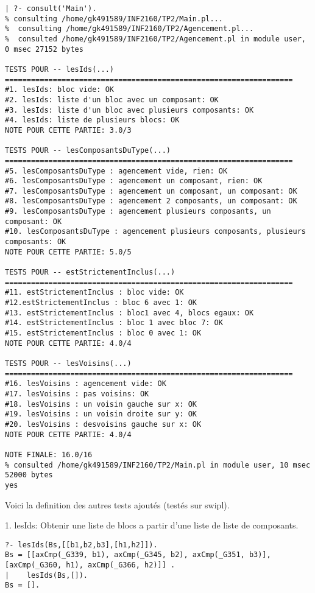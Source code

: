 \documentclass[letterpaper,11pt]{letter}
\begin{document}
\begin{verbatim}
| ?- consult('Main').
% consulting /home/gk491589/INF2160/TP2/Main.pl...
%  consulting /home/gk491589/INF2160/TP2/Agencement.pl...
%  consulted /home/gk491589/INF2160/TP2/Agencement.pl in module user, 0 msec 27152 bytes

TESTS POUR -- lesIds(...)
==================================================================
#1. lesIds: bloc vide: OK
#2. lesIds: liste d'un bloc avec un composant: OK
#3. lesIds: liste d'un bloc avec plusieurs composants: OK
#4. lesIds: liste de plusieurs blocs: OK
NOTE POUR CETTE PARTIE: 3.0/3

TESTS POUR -- lesComposantsDuType(...)
==================================================================
#5. lesComposantsDuType : agencement vide, rien: OK
#6. lesComposantsDuType : agencement un composant, rien: OK
#7. lesComposantsDuType : agencement un composant, un composant: OK
#8. lesComposantsDuType : agencement 2 composants, un composant: OK
#9. lesComposantsDuType : agencement plusieurs composants, un composant: OK
#10. lesComposantsDuType : agencement plusieurs composants, plusieurs composants: OK
NOTE POUR CETTE PARTIE: 5.0/5

TESTS POUR -- estStrictementInclus(...)
==================================================================
#11. estStrictementInclus : bloc vide: OK
#12.estStrictementInclus : bloc 6 avec 1: OK
#13. estStrictementInclus : bloc1 avec 4, blocs egaux: OK
#14. estStrictementInclus : bloc 1 avec bloc 7: OK
#15. estStrictementInclus : bloc 0 avec 1: OK
NOTE POUR CETTE PARTIE: 4.0/4

TESTS POUR -- lesVoisins(...)
==================================================================
#16. lesVoisins : agencement vide: OK
#17. lesVoisins : pas voisins: OK
#18. lesVoisins : un voisin gauche sur x: OK
#19. lesVoisins : un voisin droite sur y: OK
#20. lesVoisins : desvoisins gauche sur x: OK
NOTE POUR CETTE PARTIE: 4.0/4

NOTE FINALE: 16.0/16
% consulted /home/gk491589/INF2160/TP2/Main.pl in module user, 10 msec 52000 bytes
yes
\end{verbatim}

Voici la definition des autres tests ajoutés (testés sur swipl).

1. lesIds: Obtenir une liste de blocs a partir d'une liste de liste de composants.
\begin{Verbatim}[fontsize=\small]
?- lesIds(Bs,[[b1,b2,b3],[h1,h2]]).
Bs = [[axCmp(_G339, b1), axCmp(_G345, b2), axCmp(_G351, b3)], [axCmp(_G360, h1), axCmp(_G366, h2)]] .
|    lesIds(Bs,[]).
Bs = [].
\end{Verbatim}
\end{document}

